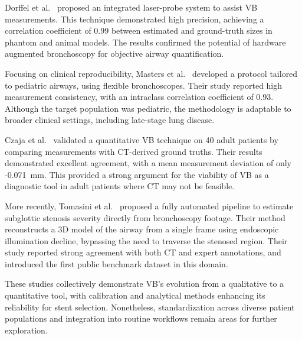 Dorffel et al.~\cite{dorffel1999} proposed an integrated laser-probe system to assist VB measurements. This technique demonstrated high precision, achieving a correlation coefficient of 0.99 between estimated and ground-truth sizes in phantom and animal models. The results confirmed the potential of hardware augmented bronchoscopy for objective airway quantification.

Focusing on clinical reproducibility, Masters et al.~\cite{masters2005} developed a protocol tailored to pediatric airways, using flexible bronchoscopes. Their study reported high measurement consistency, with an intraclass correlation coefficient of 0.93. Although the target population was pediatric, the methodology is adaptable to broader clinical settings, including late-stage lung disease.

Czaja et al.~\cite{czaja2007} validated a quantitative VB technique on 40 adult patients by comparing measurements with CT-derived ground truths. Their results demonstrated excellent agreement, with a mean measurement deviation of only -0.071~mm. This provided a strong argument for the viability of VB as a diagnostic tool in adult patients where CT may not be feasible.

More recently, Tomasini et al.~\cite{tomasini2025} proposed a fully automated pipeline to estimate subglottic stenosis severity directly from bronchoscopy footage. Their method reconstructs a 3D model of the airway from a single frame using endoscopic illumination decline, bypassing the need to traverse the stenosed region. Their study reported strong agreement with both CT and expert annotations, and introduced the first public benchmark dataset in this domain. 

These studies collectively demonstrate VB’s evolution from a qualitative to a quantitative tool, with calibration and analytical methods enhancing its reliability for stent selection. Nonetheless, standardization across diverse patient populations and integration into routine workflows remain areas for further exploration.


